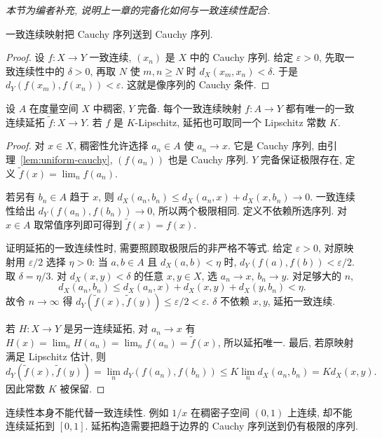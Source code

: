 \emph{本节为编者补充, 说明上一章的完备化如何与一致连续性配合.}

\begin{lemma}\label{lem:uniform-cauchy}
一致连续映射把 Cauchy 序列送到 Cauchy 序列.
\end{lemma}
\begin{proof}
设 $f:X\to Y$ 一致连续, $(x_n)$ 是 $X$ 中的 Cauchy 序列. 给定 $\varepsilon>0$, 先取一致连续性中的 $\delta>0$, 再取 $N$ 使 $m,n\geq N$ 时 $d_X(x_m,x_n)<\delta$. 于是 $d_Y(f(x_m),f(x_n))<\varepsilon$. 这就是像序列的 Cauchy 条件.
\end{proof}

\begin{theorem}\label{thm:uniform-extension}
设 $A$ 在度量空间 $X$ 中稠密, $Y$ 完备. 每个一致连续映射 $f:A\to Y$ 都有唯一的一致连续延拓 $\widetilde f:X\to Y$. 若 $f$ 是 $K$-Lipschitz, 延拓也可取同一个 Lipschitz 常数 $K$.
\end{theorem}
\begin{proof}
对 $x\in X$, 稠密性允许选择 $a_n\in A$ 使 $a_n\to x$. 它是 Cauchy 序列, 由引理~\ref{lem:uniform-cauchy}, $(f(a_n))$ 也是 Cauchy 序列. $Y$ 完备保证极限存在, 定义
$\widetilde f(x)=\lim_nf(a_n)$.

若另有 $b_n\in A$ 趋于 $x$, 则
$d_X(a_n,b_n)\leq d_X(a_n,x)+d_X(x,b_n)\to0$. 一致连续性给出 $d_Y(f(a_n),f(b_n))\to0$, 所以两个极限相同. 定义不依赖所选序列. 对 $x\in A$ 取常值序列即可得到 $\widetilde f(x)=f(x)$.

证明延拓的一致连续性时, 需要照顾取极限后的非严格不等式. 给定 $\varepsilon>0$, 对原映射用 $\varepsilon/2$ 选择 $\eta>0$: 当 $a,b\in A$ 且 $d_X(a,b)<\eta$ 时, $d_Y(f(a),f(b))<\varepsilon/2$. 取 $\delta=\eta/3$. 对 $d_X(x,y)<\delta$ 的任意 $x,y\in X$, 选 $a_n\to x$, $b_n\to y$. 对足够大的 $n$,
\[
d_X(a_n,b_n)\leq d_X(a_n,x)+d_X(x,y)+d_X(y,b_n)<\eta.
\]
故令 $n\to\infty$ 得
$d_Y(\widetilde f(x),\widetilde f(y))\leq\varepsilon/2<\varepsilon$. $\delta$ 不依赖 $x,y$, 延拓一致连续.

若 $H:X\to Y$ 是另一连续延拓, 对 $a_n\to x$ 有
$H(x)=\lim_nH(a_n)=\lim_nf(a_n)=\widetilde f(x)$, 所以延拓唯一. 最后, 若原映射满足 Lipschitz 估计, 则
\[
d_Y(\widetilde f(x),\widetilde f(y))
=\lim_nd_Y(f(a_n),f(b_n))
\leq K\lim_nd_X(a_n,b_n)=Kd_X(x,y).
\]
因此常数 $K$ 被保留.
\end{proof}

连续性本身不能代替一致连续性. 例如 $1/x$ 在稠密子空间 $(0,1)$ 上连续, 却不能连续延拓到 $[0,1]$. 延拓构造需要把趋于边界的 Cauchy 序列送到仍有极限的序列.



